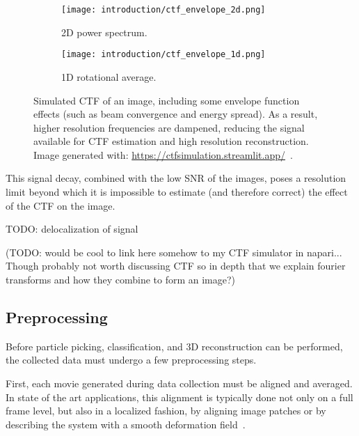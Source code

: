 \begin{figure}[ht]
    \centering
    \begin{subfigure}[B]{.42\textwidth}
        \centering
        \texttt{[image: introduction/ctf\_envelope\_2d.png]}
        \caption{2D power spectrum.}
        \label{fig:em_ctf_envelope_2d}
    \end{subfigure}%
    \hfill
    \begin{subfigure}[B]{.55\textwidth}
        \centering
        \texttt{[image: introduction/ctf\_envelope\_1d.png]}
        \caption{1D rotational average.}
        \label{fig:em_ctf_envelope_1d}
    \end{subfigure}%
    \caption[CTF: effect of the envelope function]{Simulated CTF of an image, including some envelope function effects (such as beam convergence and energy spread). As a result, higher resolution frequencies are dampened, reducing the signal available for CTF estimation and high resolution reconstruction. Image generated with: \url{https://ctfsimulation.streamlit.app/}~\cite{jiangWebbasedSimulationContrast2001}.}
    \label{fig:em_ctf_envelope}
\end{figure}

This signal decay, combined with the low SNR of the images, poses a resolution limit beyond which it is impossible to estimate (and therefore correct) the effect of the CTF on the image.

TODO: delocalization of signal

(TODO: would be cool to link here somehow to my CTF simulator in napari... Though probably not worth discussing CTF so in depth that we explain fourier transforms and how they combine to form an image?)

\subsection{Preprocessing}

Before particle picking, classification, and 3D reconstruction can be performed, the collected data must undergo a few preprocessing steps.

First, each movie generated during data collection must be aligned and averaged.
In state of the art applications, this alignment is typically done not only on a full frame level, but also in a localized fashion, by aligning image patches or by describing the system with a smooth deformation field~\cite{zhengMotionCor2AnisotropicCorrection2017,punjaniCryoSPARCAlgorithmsRapid2017,tegunovRealtimeCryoelectronMicroscopy2019}.

